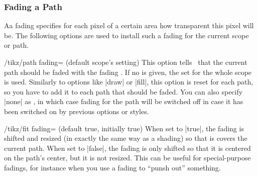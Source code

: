 \subsubsection{Fading a Path}

Aa fading specifies for each pixel of a certain area how transparent
this pixel will be. The following options are used to install such a
fading for the current scope or path.


\begin{key}{/tikz/path fading= (default \normalfont scope's setting)}
  This option tells \tikzname\ that the current path should be faded
  with the fading . If no  is given, the
   set for the whole scope is used. Similarly to options
  like |draw| or |fill|, this option is reset for each path, so you
  have to add it to each path that should be faded. You can also
  specify |none| as , in which case fading for the path
  will be switched off in case it has been switched on by previous
  options or styles.
\begin{codeexample}[]
\end{codeexample}

  \begin{key}{/tikz/fit fading= (default true, initially true)}
    When set to |true|, the fading is shifted and resized (in exactly
    the same way as a shading) so that is covers the current
    path. When set to |false|, the fading is only shifted so that it
    is centered on the path's center, but it is not resized. This can
    be useful for special-purpose fadings, for instance when you use a
    fading to ``punsh out'' something.                                      %
  \end{key}


\end{key}
